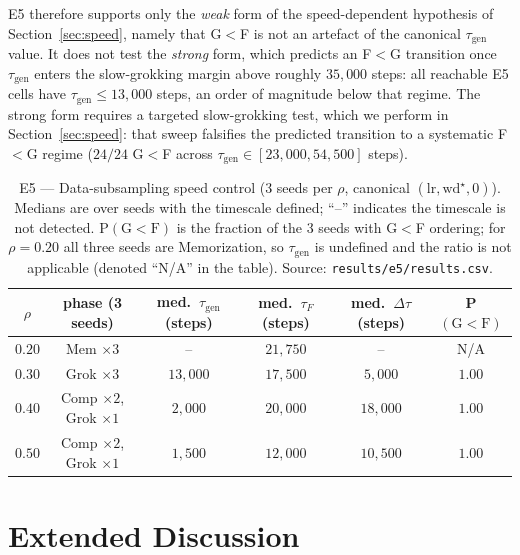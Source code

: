 \documentclass{article}
\newcommand{\taug}{\tau_{\mathrm{gen}}}
\newcommand{\tauf}{\tau_{F}}
\newcommand{\Dtau}{\Delta\tau}
\begin{document}
E5 therefore supports only the \emph{weak} form of the
speed-dependent hypothesis of Section~\ref{sec:speed}, namely
that G$<$F is not an artefact of the canonical $\taug$ value.
It does not test the \emph{strong} form, which predicts an
F$<$G transition once $\taug$ enters the slow-grokking margin
above roughly $35{,}000$ steps: all reachable E5 cells have
$\taug\leq 13{,}000$ steps, an order of magnitude below that
regime.
The strong form requires a targeted slow-grokking test, which we
perform in Section~\ref{sec:speed}: that sweep falsifies the
predicted transition to a systematic F$<$G regime
($24/24$ G$<$F across $\taug\in[23{,}000, 54{,}500]$ steps).

\begin{table}[tbp]
  \centering
  \caption{E5 --- Data-subsampling speed control
    (3 seeds per $\rho$, canonical
    $(\mathrm{lr},\mathrm{wd}^{\star},0)$).
    Medians are over seeds with the timescale defined;
    ``--'' indicates the timescale is not detected.
    $\mathrm{P}(\mathrm{G}{<}\mathrm{F})$ is the fraction of the
    3 seeds with G$<$F ordering; for $\rho{=}0.20$ all three seeds
    are Memorization, so $\taug$ is undefined and the ratio is not
    applicable (denoted ``N/A'' in the table).
    Source: \texttt{results/e5/results.csv}.}
  \label{tab:e5_subsample}
  \small
  \begin{tabular}{cccccc}
    \toprule
    $\rho$ & phase (3 seeds) & med.\ $\taug$ (steps) & med.\ $\tauf$ (steps) &
    med.\ $\Dtau$ (steps) & P$(\mathrm{G}{<}\mathrm{F})$ \\
    \midrule
    $0.20$ & Mem $\times 3$                 & --         & $21{,}750$ & --          & N/A \\
    $0.30$ & Grok $\times 3$                & $13{,}000$ & $17{,}500$ & $5{,}000$   & $1.00$ \\
    $0.40$ & Comp $\times 2$, Grok $\times 1$ & $2{,}000$  & $20{,}000$ & $18{,}000$  & $1.00$ \\
    $0.50$ & Comp $\times 2$, Grok $\times 1$ & $1{,}500$  & $12{,}000$ & $10{,}500$  & $1.00$ \\
    \bottomrule
  \end{tabular}
\end{table}

\section{Extended Discussion}
\label{app:discussion_extended}
\end{document}
